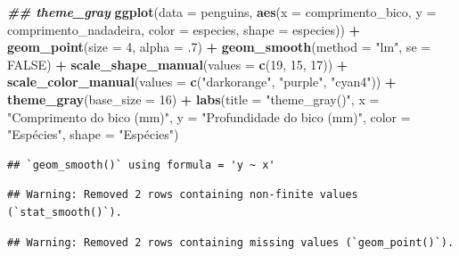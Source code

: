 \documentclass[
]{article}
\newenvironment{Shaded}{\begin{snugshade}}{\end{snugshade}}
\newcommand{\AttributeTok}[1]{\textcolor[rgb]{0.13,0.29,0.53}{#1}}
\newcommand{\ConstantTok}[1]{\textcolor[rgb]{0.56,0.35,0.01}{#1}}
\newcommand{\DecValTok}[1]{\textcolor[rgb]{0.00,0.00,0.81}{#1}}
\newcommand{\DocumentationTok}[1]{\textcolor[rgb]{0.56,0.35,0.01}{\textbf{\textit{#1}}}}
\newcommand{\FunctionTok}[1]{\textcolor[rgb]{0.13,0.29,0.53}{\textbf{#1}}}
\newcommand{\NormalTok}[1]{#1}
\newcommand{\SpecialCharTok}[1]{\textcolor[rgb]{0.81,0.36,0.00}{\textbf{#1}}}
\newcommand{\StringTok}[1]{\textcolor[rgb]{0.31,0.60,0.02}{#1}}
\begin{document}
\begin{Shaded}
\begin{Highlighting}[]
\DocumentationTok{\#\# theme\_gray}
\FunctionTok{ggplot}\NormalTok{(}\AttributeTok{data =}\NormalTok{ penguins, }
       \FunctionTok{aes}\NormalTok{(}\AttributeTok{x =}\NormalTok{ comprimento\_bico, }\AttributeTok{y =}\NormalTok{ comprimento\_nadadeira,}
           \AttributeTok{color =}\NormalTok{ especies, }\AttributeTok{shape =}\NormalTok{ especies)) }\SpecialCharTok{+}
    \FunctionTok{geom\_point}\NormalTok{(}\AttributeTok{size =} \DecValTok{4}\NormalTok{, }\AttributeTok{alpha =}\NormalTok{ .}\DecValTok{7}\NormalTok{) }\SpecialCharTok{+}
    \FunctionTok{geom\_smooth}\NormalTok{(}\AttributeTok{method =} \StringTok{"lm"}\NormalTok{, }\AttributeTok{se =} \ConstantTok{FALSE}\NormalTok{) }\SpecialCharTok{+}
    \FunctionTok{scale\_shape\_manual}\NormalTok{(}\AttributeTok{values =} \FunctionTok{c}\NormalTok{(}\DecValTok{19}\NormalTok{, }\DecValTok{15}\NormalTok{, }\DecValTok{17}\NormalTok{)) }\SpecialCharTok{+}
    \FunctionTok{scale\_color\_manual}\NormalTok{(}\AttributeTok{values =} \FunctionTok{c}\NormalTok{(}\StringTok{"darkorange"}\NormalTok{, }\StringTok{"purple"}\NormalTok{, }\StringTok{"cyan4"}\NormalTok{)) }\SpecialCharTok{+}
    \FunctionTok{theme\_gray}\NormalTok{(}\AttributeTok{base\_size =} \DecValTok{16}\NormalTok{) }\SpecialCharTok{+}
    \FunctionTok{labs}\NormalTok{(}\AttributeTok{title =} \StringTok{"theme\_gray()"}\NormalTok{, }\AttributeTok{x =} \StringTok{"Comprimento do bico (mm)"}\NormalTok{, }
         \AttributeTok{y =} \StringTok{"Profundidade do bico (mm)"}\NormalTok{, }\AttributeTok{color =} \StringTok{"Espécies"}\NormalTok{, }\AttributeTok{shape =} \StringTok{"Espécies"}\NormalTok{) }
\end{Highlighting}
\end{Shaded}

\begin{verbatim}
## `geom_smooth()` using formula = 'y ~ x'
\end{verbatim}

\begin{verbatim}
## Warning: Removed 2 rows containing non-finite values (`stat_smooth()`).
\end{verbatim}

\begin{verbatim}
## Warning: Removed 2 rows containing missing values (`geom_point()`).
\end{verbatim}
\end{document}
